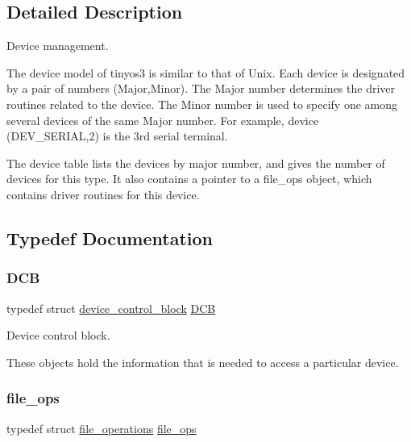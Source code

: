 \subsection{Detailed Description}
Device management. 

The device model of tinyos3 is similar to that of Unix. Each device is designated by a pair of numbers (Major,Minor). The Major number determines the driver routines related to the device. The Minor number is used to specify one among several devices of the same Major number. For example, device (D\+E\+V\+\_\+\+S\+E\+R\+I\+AL,2) is the 3rd serial terminal.

The device table lists the devices by major number, and gives the number of devices for this type. It also contains a pointer to a file\+\_\+ops object, which contains driver routines for this device. 

\subsection{Typedef Documentation}
\mbox{\label{group__dev_gaf0e2d4a982667466d84f6fb7522611d6}} 
\subsubsection{\texorpdfstring{D\+CB}{DCB}}
{\footnotesize\ttfamily typedef struct \hyperlink{structdevice__control__block}{device\+\_\+control\+\_\+block}  \hyperlink{group__dev_gaf0e2d4a982667466d84f6fb7522611d6}{D\+CB}}



Device control block. 

These objects hold the information that is needed to access a particular device. \mbox{\label{group__dev_gaab625d8ae3a95e942ed10ed1579f5042}} 
\subsubsection{\texorpdfstring{file\+\_\+ops}{file\_ops}}
{\footnotesize\ttfamily typedef struct \hyperlink{structfile__operations}{file\+\_\+operations}  \hyperlink{group__dev_gaab625d8ae3a95e942ed10ed1579f5042}{file\+\_\+ops}}



